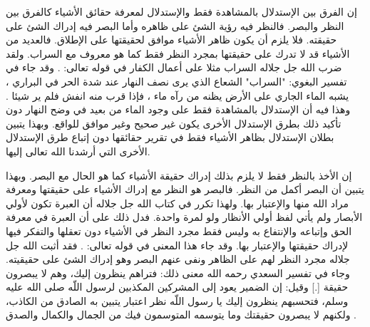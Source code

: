 إن الفرق بين الإستدلال بالمشاهدة فقط والإستدلال لمعرفة حقائق الأشياء كالفرق بين النظر والبصر. فالنظر فيه رؤية الشئ على ظاهره وأما البصر فيه إدراك الشئ على حقيقته. فلا يلزم أن يكون ظاهر الأشياء موافق لحقيقتها على الإطلاق. فالعديد من الأشياء قد لا تدرك على حقيقتها بمجرد النظر فقط كما هو معروف مع السراب. ولقد ضرب الله جل جلاله السراب مثلا على أعمال الكفار في قوله تعالى: \quranayah*[24][39]{\footnotesize \surahname*[24]}. وقد جاء في تفسير البغوي: "السراب" الشعاع الذي يرى نصف النهار عند شدة الحر في البراري ، يشبه الماء الجاري على الأرض يظنه من رآه ماء ، فإذا قرب منه انفش فلم ير شيئا \cite{tafsir_Baghawi}. وهذا فيه أن الإستدلال بالمشاهدة فقط على وجود الماء من بعيد في وضح النهار دون تأكيد ذلك بطرق الإستدلال الأخرى يكون غير صحيح وغير موافق للواقع. وبهذا يتبين بطلان الإستدلال بظاهر الأشياء فقط في تقرير حقائقها دون إتباع طرق الإستدلال الأخرى التي أرشدنا الله تعالى إليها.

إن الأخذ بالنظر فقط لا يلزم بذلك إدراك حقيقة الأشياء كما هو الحال مع البصر. وبهذا يتبين أن البصر أكمل من النظر. فالبصر هو النظر مع إدراك الأشياء على حقيقتها ومعرفة مراد الله منها والإعتبار بها. ولهذا تكرر في كتاب الله جل جلاله أن العبرة تكون لأولي الأبصار ولم يأتي لفظ أولي الأنظار ولو لمرة واحدة. فدل ذلك على أن العبرة في معرفة الحق وإتباعه والإنتفاع به وليس فقط مجرد النظر في الأشياء دون تعقلها والتفكر فيها لإدراك حقيقتها والإعتبار بها.
وقد جاء هذا المعنى في قوله تعالى: \quranayah*[7][198]{\footnotesize \surahname*[7]}. فقد أثبت الله جل جلاله مجرد النظر لهم على الظاهر ونفى عنهم البصر وهو إدراك الشئ على حقيقيته. وجاء في تفسير السعدي رحمه الله معنى ذلك: فتراهم ينظرون إليك، وهم لا يبصرون حقيقة [.] وقيل: إن الضمير يعود إلى المشركين المكذبين لرسول اللّه صلى الله عليه وسلم، فتحسبهم ينظرون إليك يا رسول اللّه نظر اعتبار يتبين به الصادق من الكاذب، ولكنهم لا يبصرون حقيقتك وما يتوسمه المتوسمون فيك من الجمال والكمال والصدق \cite{tafsir_Saadi}.


